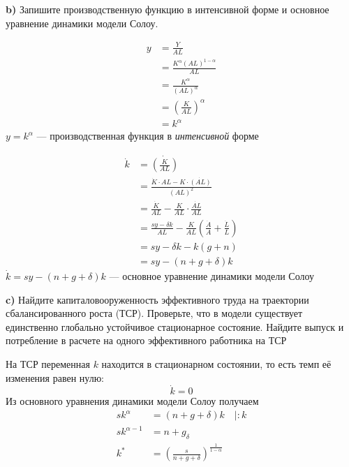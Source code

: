 \documentclass[a4paper, 10pt]{article}
\begin{document}
\begin{tcolorbox}[colback=blue!20!white, colframe=black!100!black]
    \textbf{b)} Запишите производственную функцию в интенсивной форме и основное уравнение динамики модели Солоу.
\end{tcolorbox}
\begin{equation*}
    \begin{aligned}
        y&=\frac{Y}{AL}\\
        &=\frac{K^{\alpha}(AL)^{1-\alpha}}{AL}\\
        &=\frac{K^{\alpha}}{(AL)^{\alpha}}\\
        &=\left(\frac{K}{AL}\right)^{\alpha}\\
        &=k^{\alpha}
    \end{aligned}
\end{equation*}
$y=k^{\alpha}$ — производственная функция в \textit{интенсивной} форме

\begin{equation*}
    \begin{aligned}
        \dot{k}&=\dot{\left(\frac{K}{AL}\right)}\\
        &=\frac{\dot{K}\cdot AL-K\cdot \dot{(AL)}}{(AL)^2}\\
        &=\frac{\dot{K}}{AL}-\frac{K}{AL}\cdot\frac{\dot{AL}}{AL}\\
        &=\frac{sy-\delta k}{AL}-\frac{K}{AL}\left(\frac{\dot{A}}{A}+\frac{\dot{L}}{L}\right)\\
        &=sy-\delta k - k(g+n)\\
        &=sy-(n+g+\delta)k
    \end{aligned}
\end{equation*}
$\dot{k}=sy-(n+g+\delta)k$ — основное уравнение динамики модели Солоу

\begin{tcolorbox}[colback=blue!20!white, colframe=black!100!black]
    \textbf{c)} Найдите капиталовооруженность эффективного труда на траектории сбалансированного роста (ТСР). Проверьте, что в модели существует единственно глобально устойчивое стационарное состояние. Найдите выпуск и потребление в расчете на одного эффективного работника на ТСР
\end{tcolorbox}

На ТСР переменная $k$ находится в стационарном состоянии, то есть темп её изменения равен нулю:
\begin{equation*}
    \dot{k}=0
\end{equation*}
Из основного уравнения динамики модели Солоу получаем
\begin{equation*}
    \begin{aligned}
        sk^{\alpha}&=(n+g+\delta)k\quad\vert :k\\
        sk^{\alpha-1}&=n+g_\delta\\
        k^{*}&=\left(\frac{s}{n+g+\delta}\right)^{\frac{1}{1-\alpha}}
    \end{aligned}
\end{equation*}
\end{document}
